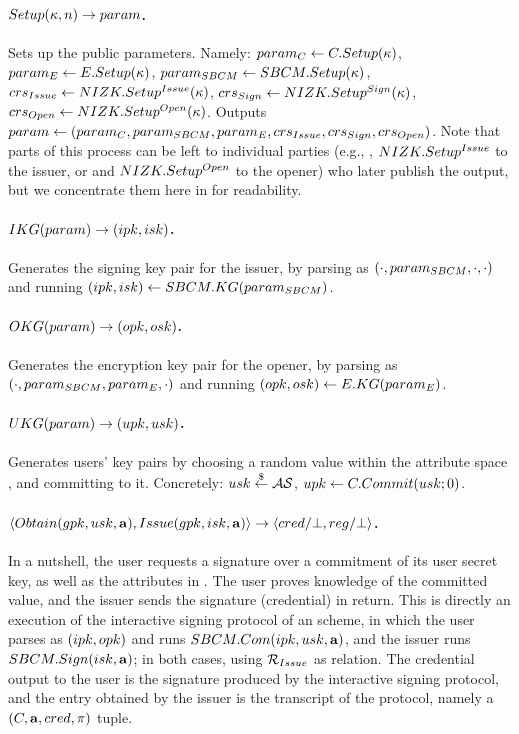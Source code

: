 \paragraph{$Setup(\kappa,n) \rightarrow param$.} %
Sets up the public parameters. Namely: $param_C \gets C.Setup(\kappa)$, $param_{E}
\gets E.Setup(\kappa)$, $param_{SBCM} \gets SBCM.Setup(\kappa)$,
$crs_{Issue} \gets NIZK.Setup^{Issue}(\kappa)$, $crs_{Sign} \gets
NIZK.Setup^{Sign} (\kappa)$, $crs_{Open}\gets NIZK.Setup^{Open}(\kappa)$.
Outputs $param \gets (param_C,param_{SBCM},param_{E},crs_{Issue},crs_{Sign},
crs_{Open})$. Note that parts of this process can be left to individual
parties (e.g., \SBCMSetup, $NIZK.Setup^{Issue}$ to the issuer, or \ESetup and
$NIZK.Setup^{Open}$ to the opener) who later publish the output, but we
concentrate them here in \Setup for readability.

\paragraph{$IKG(param) \rightarrow (ipk,isk)$.} %
Generates the signing key pair for the issuer, by parsing \parm as
$(\cdot,param_{SBCM},\cdot,\cdot)$ and running $(ipk,isk) \gets
SBCM.KG(param_{SBCM})$.

\paragraph{$OKG(param) \rightarrow (opk,osk)$.} %
Generates the encryption key pair for the opener, by parsing \parm as
$(\cdot,param_{SBCM},param_{E},\cdot)$ and running $(opk,osk) \gets
E.KG(param_{E})$.

\paragraph{$UKG(param) \rightarrow (upk,usk)$.} %
Generates users' key pairs by choosing a random value within the attribute space
\AttrSpace, and committing to it. Concretely: $usk \stackrel{\$}{\gets} \mathcal{AS}$, $upk
\gets C.Commit(usk; 0)$.

\paragraph{$\langle Obtain(gpk,usk,\mathbf{a}),Issue(gpk,isk,\mathbf{a}) \rangle
  \rightarrow \langle cred/\bot,reg/\bot \rangle$.} %
In a nutshell, the user requests a signature over a commitment of its user
secret key, as well as the attributes in \attrs. The user proves knowledge of
the committed value, and the issuer sends the signature (credential) in return.
This is directly an execution of the interactive signing protocol of an \SBCM
scheme, in which the user parses \gpk as $(ipk,opk)$ and runs $SBCM.Com(ipk,
usk,\mathbf{a})$, and the issuer runs $SBCM.Sign(isk,\mathbf{a})$; in both cases,
using $\mathcal{R}_{Issue}$ as \NIZK relation. The credential \cred output to the
user is the signature produced by the interactive signing protocol, and the
\utrans entry obtained by the issuer is the transcript of the protocol, namely
a $(C,\mathbf{a},cred,\pi)$ tuple.

